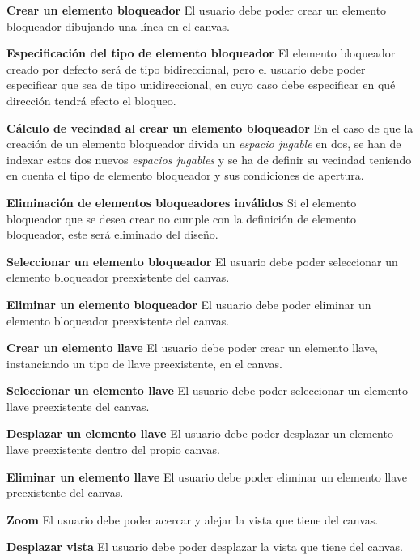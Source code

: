 \begin{functional}
	\item \textbf{Crear un elemento bloqueador}\newline
		El usuario debe poder crear un elemento bloqueador dibujando una línea en el canvas.
		\begin{functional}
			\item \textbf{Especificación del tipo de elemento bloqueador}\newline
				El elemento bloqueador creado por defecto será de tipo bidireccional, pero el usuario debe poder especificar que sea de tipo unidireccional, en cuyo caso debe especificar en qué dirección tendrá efecto el bloqueo.
			\item \textbf{Cálculo de vecindad al crear un elemento bloqueador}\newline
				En el caso de que la creación de un elemento bloqueador divida un \textit{espacio jugable} en dos, se han de indexar estos dos nuevos \textit{espacios jugables} y se ha de definir su vecindad teniendo en cuenta el tipo de elemento bloqueador y sus condiciones de apertura.
			\item \textbf{Eliminación de elementos bloqueadores inválidos}\newline
				Si el elemento bloqueador que se desea crear no cumple con la definición de elemento bloqueador, este será eliminado del diseño.
		\end{functional}
	\item \textbf{Seleccionar un elemento bloqueador}\newline
		El usuario debe poder seleccionar un elemento bloqueador preexistente del canvas.
	\item \textbf{Eliminar un elemento bloqueador}\newline
		El usuario debe poder eliminar un elemento bloqueador preexistente del canvas.
	\item \textbf{Crear un elemento llave}\newline
		El usuario debe poder crear un elemento llave, instanciando un tipo de llave preexistente, en el canvas.
	\item \textbf{Seleccionar un elemento llave}\newline
		El usuario debe poder seleccionar un elemento llave preexistente del canvas.
	\item \textbf{Desplazar un elemento llave}\newline
		El usuario debe poder desplazar un elemento llave preexistente dentro del propio canvas.
	\item \textbf{Eliminar un elemento llave}\newline
		El usuario debe poder eliminar un elemento llave preexistente del canvas.
	\item \textbf{Zoom}\newline
		El usuario debe poder acercar y alejar la vista que tiene del canvas.
	\item \textbf{Desplazar vista}\newline
		El usuario debe poder desplazar la vista que tiene del canvas.
\end{functional}